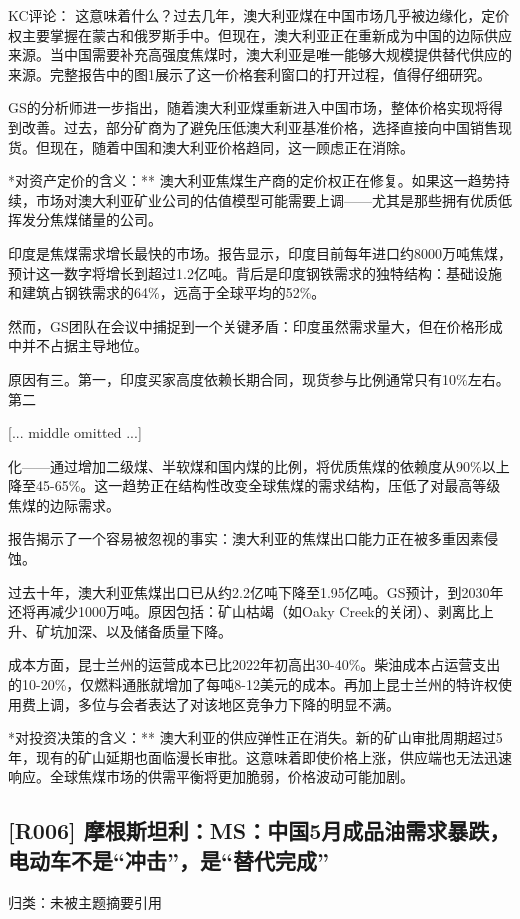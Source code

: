\documentclass[11pt]{ctexart}
\begin{document}
KC评论： 这意味着什么？过去几年，澳大利亚煤在中国市场几乎被边缘化，定价权主要掌握在蒙古和俄罗斯手中。但现在，澳大利亚正在重新成为中国的边际供应来源。当中国需要补充高强度焦煤时，澳大利亚是唯一能够大规模提供替代供应的来源。完整报告中的图1展示了这一价格套利窗口的打开过程，值得仔细研究。

GS的分析师进一步指出，随着澳大利亚煤重新进入中国市场，整体价格实现将得到改善。过去，部分矿商为了避免压低澳大利亚基准价格，选择直接向中国销售现货。但现在，随着中国和澳大利亚价格趋同，这一顾虑正在消除。

*对资产定价的含义：** 澳大利亚焦煤生产商的定价权正在修复。如果这一趋势持续，市场对澳大利亚矿业公司的估值模型可能需要上调——尤其是那些拥有优质低挥发分焦煤储量的公司。

印度是焦煤需求增长最快的市场。报告显示，印度目前每年进口约8000万吨焦煤，预计这一数字将增长到超过1.2亿吨。背后是印度钢铁需求的独特结构：基础设施和建筑占钢铁需求的64\%，远高于全球平均的52\%。

然而，GS团队在会议中捕捉到一个关键矛盾：印度虽然需求量大，但在价格形成中并不占据主导地位。

原因有三。第一，印度买家高度依赖长期合同，现货参与比例通常只有10\%左右。第二

[... middle omitted ...]

化——通过增加二级煤、半软煤和国内煤的比例，将优质焦煤的依赖度从90\%以上降至45-65\%。这一趋势正在结构性改变全球焦煤的需求结构，压低了对最高等级焦煤的边际需求。

报告揭示了一个容易被忽视的事实：澳大利亚的焦煤出口能力正在被多重因素侵蚀。

过去十年，澳大利亚焦煤出口已从约2.2亿吨下降至1.95亿吨。GS预计，到2030年还将再减少1000万吨。原因包括：矿山枯竭（如Oaky Creek的关闭）、剥离比上升、矿坑加深、以及储备质量下降。

成本方面，昆士兰州的运营成本已比2022年初高出30-40\%。柴油成本占运营支出的10-20\%，仅燃料通胀就增加了每吨8-12美元的成本。再加上昆士兰州的特许权使用费上调，多位与会者表达了对该地区竞争力下降的明显不满。

*对投资决策的含义：** 澳大利亚的供应弹性正在消失。新的矿山审批周期超过5年，现有的矿山延期也面临漫长审批。这意味着即使价格上涨，供应端也无法迅速响应。全球焦煤市场的供需平衡将更加脆弱，价格波动可能加剧。

\subsection{[R006] 摩根斯坦利：MS：中国5月成品油需求暴跌，电动车不是“冲击”，是“替代完成”}
{\small\color{refgray}归类：未被主题摘要引用}
\end{document}
